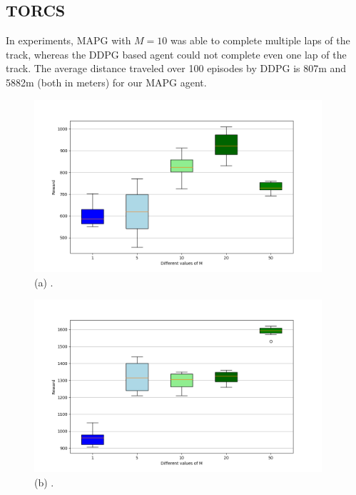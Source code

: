 \subsection{TORCS}
In  experiments, MAPG with $M=10$ was able to complete multiple laps of the track, whereas the DDPG based agent could not complete even one lap of the track. The average distance traveled over 100 episodes by DDPG is 807m and 5882m (both in meters) for our MAPG agent.

\begin{figure}[hH]
    \centering
    \begin{minipage}[b]{.45\textwidth}
        \centering
        \includegraphics[width=0.95\textwidth]{figures/box_plot.png} \\
        (a) .
        \label{fig:boxplot:hopper}
    \end{minipage}
    \begin{minipage}[b]{.45\textwidth}
        \centering
        \includegraphics[width=0.95\textwidth]{figures/walker2d_box_plot.png} \\
        (b) .

\end{minipage}
\end{figure}
